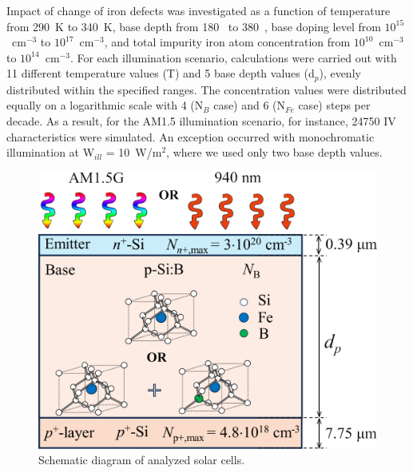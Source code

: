 \documentclass[a4paper,fleqn]{cas-sc}
\begin{document}
Impact of change of iron defects was investigated as a function of temperature from 290~K to 340~K, base depth from 180~\textnormal{\textmu} to 380~\textnormal{\textmu}, base doping level from $10^{15}$~$\mathrm{cm}^{-3}$ to $10^{17}$~$\mathrm{cm}^{-3}$, and total impurity iron atom concentration from $10^{10}$~$\mathrm{cm}^{-3}$ to $10^{14}$~$\mathrm{cm}^{-3}$. For each illumination scenario, calculations were carried out with 11 different temperature values (T) and 5 base depth values (d$_p$), evenly distributed within the specified ranges. The concentration values were distributed equally on a logarithmic scale with 4 (N$_B$ case) and 6 (N$_{Fe}$ case) steps per decade. As a result, for the AM1.5 illumination scenario, for instance, 24750 IV characteristics were simulated. An exception occurred with monochromatic illumination at W$_{ill}$  = 10~W/$\mathrm{m}^{2}$, where we used only two base depth values.

\begin{figure}
	\centering
		\includegraphics{Figure1.png}
	  \caption{Schematic diagram of analyzed solar cells.}\label{fig1}
\end{figure}
\end{document}
